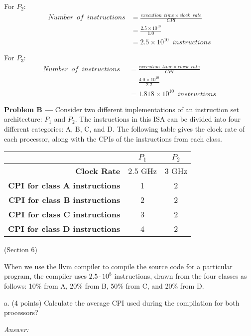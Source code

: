 \documentclass[11pt]{article}
\newcommand{\problem}[1]{\textbf{Problem #1 ---} }
\newcommand{\answer}{{\color{red}\textit{Answer: }}}
\begin{document}
For $P_2$:
\begin{align*}
    Number \enspace of \enspace instructions 
                     &= \frac{execution \enspace time \times clock \enspace rate}{CPI}\\
                     &= \frac{2.5 \times 10^{10}}{1.0}\\ 
                     &= 2.5 \times 10^{10} \enspace instructions
\end{align*}

For $P_3$:
\begin{align*}
    Number \enspace of \enspace instructions \enspace 
                     &= \frac{execution \enspace time \times clock \enspace rate}{CPI}\\
                     &= \frac{4.0 \times 10^{10}}{2.2}\\ 
                     &= 1.818 \times 10^{10} \enspace instructions
\end{align*}


\problem{B} Consider two different implementations of an instruction set architecture: $P_{1}$ and $P_{2}$.  The instructions in this ISA can be divided into four different categories:  A, B, C, and D.  The following table gives the clock rate of each processor, along with the CPIs of the instructions from each class.

\begin{center}
\begin{tabular}{r||c|c}
& $P_{1}$ & $P_{2}$ \\ \hline
\textbf{Clock Rate} & 2.5 GHz & 3 GHz \\ \hline
\textbf{CPI for class A instructions} & 1 & 2 \\ \hline
\textbf{CPI for class B instructions} & 2 & 2 \\ \hline
\textbf{CPI for class C instructions} & 3 & 2 \\ \hline
\textbf{CPI for class D instructions} & 4 & 2 \\
\end{tabular}
\end{center}
(Section 6)

When we use the llvm compiler to compile the source code for a particular program, the compiler uses $2.5 \cdot 10^{8}$ instructions, drawn from the four classes as follows:  10\% from A, 20\% from B, 50\% from C, and 20\% from D.

a. (4 points) Calculate the average CPI used during the compilation for both processors?

\answer
\end{document}
